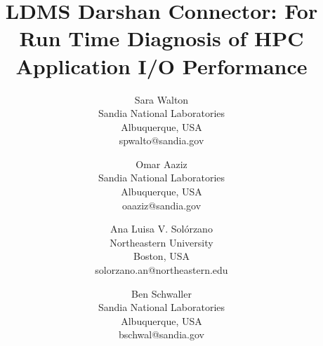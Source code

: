 \documentclass[conference]{IEEEtran}
\begin{document}
\title{LDMS Darshan Connector: For Run Time Diagnosis of HPC Application I/O Performance}

\author{
    Sara Walton\\
    Sandia National Laboratories\\
    Albuquerque, USA \\
    spwalto@sandia.gov
  \and
    Omar Aaziz\\
    Sandia National Laboratories\\
    Albuquerque, USA\\
    oaaziz@sandia.gov
    \and
    Ana Luisa V. Solórzano\\
    Northeastern University\\
    Boston, USA\\
    solorzano.an@northeastern.edu
    \and
    Ben Schwaller \\
    Sandia National Laboratories\\
    Albuquerque, USA\\
    bschwal@sandia.gov
}
\makeatletter
\newcommand{\linebreakand}{%
  \end{@IEEEauthorhalign}
  \hfill\mbox{}\par
  \mbox{}\hfill\begin{@IEEEauthorhalign}
}
\makeatother

\maketitle















%
%
\end{document}

